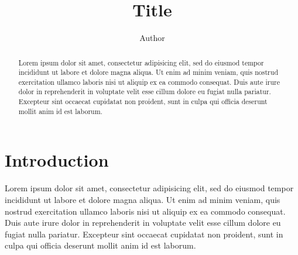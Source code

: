 \documentclass[10pt]{article}
\theoremstyle{plain}
\theoremstyle{definition}
\begin{document}
\renewcommand{\abstractname}{Translator's note.}

\title{Title}
\author{Author}
\date{}
\maketitle

\begin{abstract}
  Lorem ipsum dolor sit amet, consectetur adipisicing elit, sed do eiusmod
  tempor incididunt ut labore et dolore magna aliqua. Ut enim ad minim veniam,
  quis nostrud exercitation ullamco laboris nisi ut aliquip ex ea commodo
  consequat. Duis aute irure dolor in reprehenderit in voluptate velit esse
  cillum dolore eu fugiat nulla pariatur. Excepteur sint occaecat cupidatat non
  proident, sunt in culpa qui officia deserunt mollit anim id est laborum.
\end{abstract}

\tableofcontents



\section*{Introduction}
Lorem ipsum dolor sit amet, consectetur adipisicing elit, sed do eiusmod
tempor incididunt ut labore et dolore magna aliqua. Ut enim ad minim veniam,
quis nostrud exercitation ullamco laboris nisi ut aliquip ex ea commodo
consequat. Duis aute irure dolor in reprehenderit in voluptate velit esse
cillum dolore eu fugiat nulla pariatur. Excepteur sint occaecat cupidatat non
proident, sunt in culpa qui officia deserunt mollit anim id est laborum.



\nocite{*}


\end{document}
